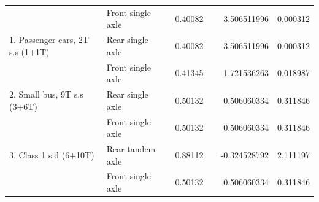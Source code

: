 \begin{table}[H]
{\begin{tabular}{|llclcr
>{\columncolor[HTML]{C0E6F5}}c |}
\multicolumn{1}{|l|}{}                                                   & \multicolumn{1}{l|}{Front single axle}  & \multicolumn{1}{c|}{}                            & \multicolumn{1}{l|}{0.40082} & \multicolumn{1}{c|}{}                           & \multicolumn{1}{r|}{3.506511996}  & 0.000312 \\ \cline{2-2} \cline{4-4} \cline{6-7}
\multicolumn{1}{|l|}{\multirow{-2}{*}{1. Passenger cars, 2T s.s (1+1T)}} & \multicolumn{1}{l|}{Rear single axle}   & \multicolumn{1}{c|}{}                            & \multicolumn{1}{l|}{0.40082} & \multicolumn{1}{c|}{}                           & \multicolumn{1}{r|}{3.506511996}  & 0.000312 \\ \cline{1-2} \cline{4-4} \cline{6-7}
\multicolumn{1}{|l|}{}                                                   & \multicolumn{1}{l|}{Front single axle}  & \multicolumn{1}{c|}{}                            & \multicolumn{1}{l|}{0.41345} & \multicolumn{1}{c|}{}                           & \multicolumn{1}{r|}{1.721536263}  & 0.018987 \\ \cline{2-2} \cline{4-4} \cline{6-7}
\multicolumn{1}{|l|}{\multirow{-2}{*}{2. Small bus, 9T s.s (3+6T)}}      & \multicolumn{1}{l|}{Rear single axle}   & \multicolumn{1}{c|}{}                            & \multicolumn{1}{l|}{0.50132} & \multicolumn{1}{c|}{}                           & \multicolumn{1}{r|}{0.506060334}  & 0.311846 \\ \cline{1-2} \cline{4-4} \cline{6-7}
\multicolumn{1}{|l|}{}                                                   & \multicolumn{1}{l|}{Front single axle}  & \multicolumn{1}{c|}{}                            & \multicolumn{1}{l|}{0.50132} & \multicolumn{1}{c|}{}                           & \multicolumn{1}{r|}{0.506060334}  & 0.311846 \\ \cline{2-2} \cline{4-4} \cline{6-7}
\multicolumn{1}{|l|}{\multirow{-2}{*}{3. Class 1 s.d (6+10T)}}           & \multicolumn{1}{l|}{Rear tandem axle}   & \multicolumn{1}{c|}{}                            & \multicolumn{1}{l|}{0.88112} & \multicolumn{1}{c|}{}                           & \multicolumn{1}{r|}{-0.324528792} & 2.111197 \\ \cline{1-2} \cline{4-4} \cline{6-7}
\multicolumn{1}{|l|}{}                                                   & \multicolumn{1}{l|}{Front single axle}  & \multicolumn{1}{c|}{}                            & \multicolumn{1}{l|}{0.50132} & \multicolumn{1}{c|}{}                           & \multicolumn{1}{r|}{0.506060334}  & 0.311846 \\ \cline{2-2} \cline{4-4} \cline{6-7}

\end{tabular}}
\end{table}
